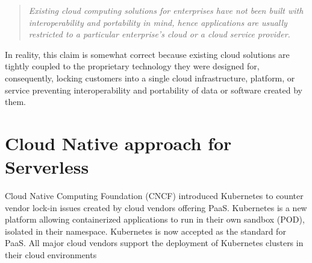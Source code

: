 \documentclass[12pt]{article}
\begin{document}
\begin{flushleft}
 \begin{quote}
 \textit{
Existing cloud computing solutions for enterprises have not been built with interoperability and portability in mind, hence applications are usually restricted to a particular enterprise's cloud or a cloud service provider.}\\
\cite{Opara-Martins-2014}
\end{quote}
\par 
In reality, this claim is somewhat correct because existing cloud solutions are tightly coupled to the proprietary technology they were designed for, consequently, locking customers into a single cloud infrastructure, platform, or service preventing interoperability and portability of data or software created by them. 
\end{flushleft}
\section{Cloud Native approach for Serverless}
\begin{flushleft}
Cloud Native Computing Foundation (CNCF) introduced Kubernetes to counter vendor lock-in issues created by cloud vendors offering PaaS. Kubernetes is a new platform allowing containerized applications to run in their own sandbox (POD), isolated in their namespace.
Kubernetes is now accepted as the standard for PaaS. All major cloud vendors support the deployment of Kubernetes clusters in their cloud environments
\end{flushleft}
\end{document}
